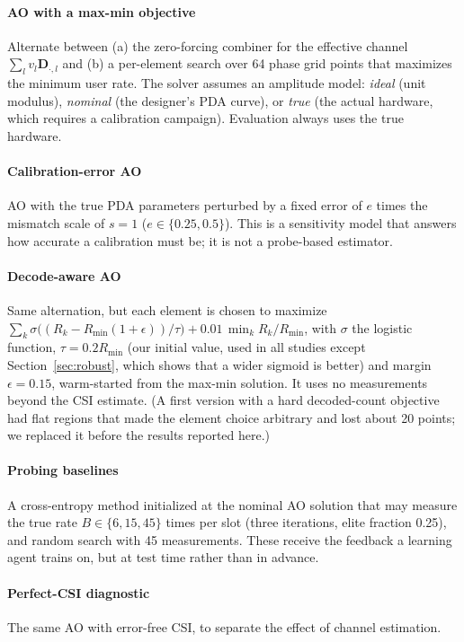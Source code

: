 \documentclass[journal]{IEEEtran}
\begin{document}
\paragraph*{AO with a max-min objective} Alternate between (a) the zero-forcing combiner for the effective channel $\sum_l v_l \mathbf{D}_{\cdot,l}$ and (b) a per-element search over 64 phase grid points that maximizes the minimum user rate. The solver assumes an amplitude model: \emph{ideal} (unit modulus), \emph{nominal} (the designer's PDA curve), or \emph{true} (the actual hardware, which requires a calibration campaign). Evaluation always uses the true hardware.

\paragraph*{Calibration-error AO} AO with the true PDA parameters perturbed by a fixed error of $e$ times the mismatch scale of $s=1$ ($e\in\{0.25,0.5\}$). This is a sensitivity model that answers how accurate a calibration must be; it is not a probe-based estimator.

\paragraph*{Decode-aware AO} Same alternation, but each element is chosen to maximize $\sum_k \sigma\!\big((R_k-R_{\text{min}}(1+\epsilon))/\tau\big)+0.01\,\min_k R_k/R_{\text{min}}$, with $\sigma$ the logistic function, $\tau=0.2R_{\text{min}}$ (our initial value, used in all studies except Section~\ref{sec:robust}, which shows that a wider sigmoid is better) and margin $\epsilon=0.15$, warm-started from the max-min solution. It uses no measurements beyond the CSI estimate. (A first version with a hard decoded-count objective had flat regions that made the element choice arbitrary and lost about 20 points; we replaced it before the results reported here.)

\paragraph*{Probing baselines} A cross-entropy method initialized at the nominal AO solution that may measure the true rate $B\in\{6,15,45\}$ times per slot (three iterations, elite fraction 0.25), and random search with 45 measurements. These receive the feedback a learning agent trains on, but at test time rather than in advance.

\paragraph*{Perfect-CSI diagnostic} The same AO with error-free CSI, to separate the effect of channel estimation.
\end{document}
